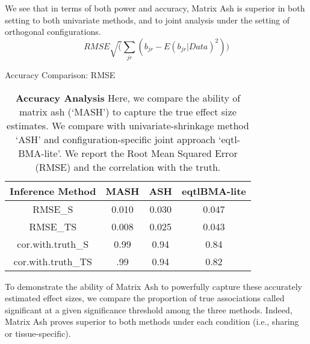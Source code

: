 We see that in terms of both power and accuracy, Matrix Ash is superior in both setting to both univariate methods, and to joint analysis under the setting of orthogonal configurations.
\begin{equation}
RMSE \sqrt(\sum_{jr}(b_{jr}-E(b_{jr}|Data)^2))
\end{equation}
\begin{table}[ht]
\caption{Accuracy Comparison: RMSE}
\centering
\begin{tabular}{c c c c}
\hline\hline
Inference Method & MASH & ASH & eqtlBMA-lite \\ [0.5ex] %
\hline
RMSE_{S}&0.010&0.030&0.047\\
RMSE_{TS}&0.008& 0.025&0.043 \\%
cor.with.truth_{S}&0.99&0.94&0.84\\
cor.with.truth_{TS}&.99&0.94&0.82\\
\hline
\end{tabular}
\label{table:RMSE}
\caption{\textbf{Accuracy Analysis} Here, we compare the ability of matrix ash (`MASH') to capture the true effect size estimates. We compare with univariate-shrinkage method `ASH' and configuration-specific joint approach `eqtl-BMA-lite'. We report the Root Mean Squared Error (RMSE) and the correlation with the truth.}
\end{table}

To demonstrate the ability of Matrix Ash to powerfully capture these accurately estimated effect sizes, we compare the proportion of true associations called significant at a given significance threshold among the three methods. Indeed, Matrix Ash  proves superior to both methods under each condition (i.e., sharing or tissue-specific). 


